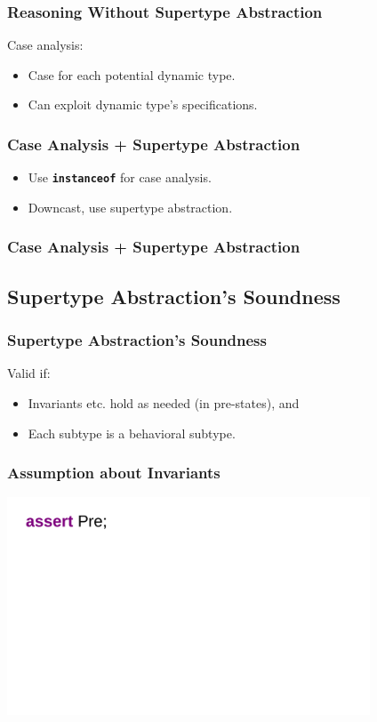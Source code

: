 \begin{frame}
\frametitle{Reasoning Without Supertype Abstraction}

Case analysis:
\begin{itemize}
\item
Case for each potential dynamic type.

\item
Can exploit dynamic type's specifications.
\end{itemize}
\end{frame}

\begin{frame}
\frametitle{Case Analysis + Supertype Abstraction}
\begin{itemize}
\item
Use \textbf{\texttt{instanceof}} for case analysis.

\item
Downcast, use supertype abstraction.
\end{itemize}
\end{frame}

\begin{frame}[fragile]
\frametitle{Case Analysis + Supertype Abstraction}

\end{frame}

\subsection[Validity]{Supertype Abstraction's Soundness}

\begin{frame}
\frametitle{Supertype Abstraction's Soundness}
Valid if:
\begin{itemize}
\item
Invariants etc. hold as needed (in pre-states), and

\item
Each subtype is a behavioral subtype.
\end{itemize}
\end{frame}

\begin{frame}
\frametitle{Assumption about Invariants}
\includegraphics[width=4.25in]{invariant-call1}
\end{frame}

